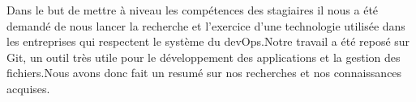 Dans le but de mettre à niveau les compétences des stagiaires il nous a été demandé de nous lancer la recherche et l'exercice d'une technologie utilisée dans les entreprises qui respectent le système du devOps.Notre travail a été reposé sur Git, un outil très utile pour le développement des applications et la gestion des fichiers.Nous avons donc fait un resumé sur nos recherches et nos connaissances acquises.